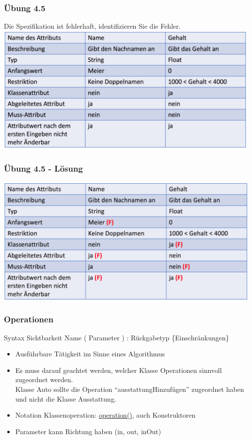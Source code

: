 \begin{frame}
\frametitle{Übung 4.5}
	Die Spezifikation ist fehlerhaft, identifizieren Sie die Fehler.
	\center
	\includegraphics[width=1\textwidth,
	keepaspectratio=true]{bilder/klassend_aufg5.png}
\end{frame}

\ifloesung
\begin{frame}
\frametitle{Übung 4.5 - Lösung}
	\center
	\includegraphics[width=1\textwidth,
	keepaspectratio=true]{bilder/klassend_aufg5_lsg.png}
\end{frame}
\fi

\begin{frame}
\frametitle{Operationen}
	\begin{block}{Syntax}
		Sichtbarkeit Name ( Parameter ) : Rückgabetyp \{Einschränkungen\}
	\end{block}
	\begin{itemize}
		\item Ausführbare Tätigkeit im Sinne eines Algorithmus
		\item Es muss darauf geachtet werden, welcher Klasse Operationen sinnvoll zugeordnet werden.\\
		Klasse Auto sollte die Operation ``ausstattungHinzufügen'' zugeordnet haben und nicht die Klasse Ausstattung.
		\item Notation Klassenoperation: \uline{operation()}, auch Konstruktoren
		\item Parameter kann Richtung haben (in, out, inOut)
	\end{itemize}
\end{frame}

